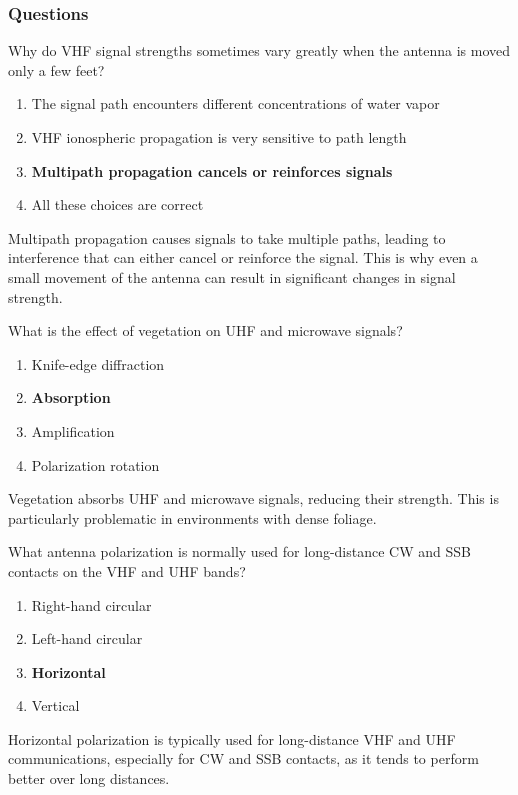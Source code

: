 \subsubsection{Questions}

\begin{tcolorbox}[colback=gray!10!white,colframe=black!75!black,title={T3A01}]
    Why do VHF signal strengths sometimes vary greatly when the antenna is moved only a few feet?
    \begin{enumerate}[label=\Alph*),noitemsep]
        \item The signal path encounters different concentrations of water vapor
        \item VHF ionospheric propagation is very sensitive to path length
        \item \textbf{Multipath propagation cancels or reinforces signals}
        \item All these choices are correct
    \end{enumerate}
\end{tcolorbox}
Multipath propagation causes signals to take multiple paths, leading to interference that can either cancel or reinforce the signal. This is why even a small movement of the antenna can result in significant changes in signal strength.

\begin{tcolorbox}[colback=gray!10!white,colframe=black!75!black,title={T3A02}]
    What is the effect of vegetation on UHF and microwave signals?
    \begin{enumerate}[label=\Alph*),noitemsep]
        \item Knife-edge diffraction
        \item \textbf{Absorption}
        \item Amplification
        \item Polarization rotation
    \end{enumerate}
\end{tcolorbox}
Vegetation absorbs UHF and microwave signals, reducing their strength. This is particularly problematic in environments with dense foliage.

\begin{tcolorbox}[colback=gray!10!white,colframe=black!75!black,title={T3A03}]
    What antenna polarization is normally used for long-distance CW and SSB contacts on the VHF and UHF bands?
    \begin{enumerate}[label=\Alph*),noitemsep]
        \item Right-hand circular
        \item Left-hand circular
        \item \textbf{Horizontal}
        \item Vertical
    \end{enumerate}
\end{tcolorbox}
Horizontal polarization is typically used for long-distance VHF and UHF communications, especially for CW and SSB contacts, as it tends to perform better over long distances.

